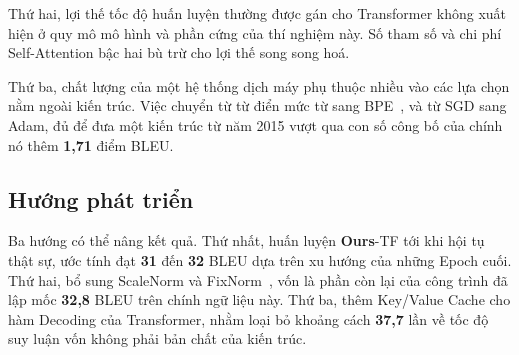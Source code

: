 \documentclass[11pt,a4paper]{article}
\newcommand{\ours}{\textbf{Ours}}
\begin{document}
Thứ hai, lợi thế tốc độ huấn luyện thường được gán cho Transformer không xuất
hiện ở quy mô mô hình và phần cứng của thí nghiệm này. Số tham số và chi phí
Self-Attention bậc hai bù trừ cho lợi thế song song hoá.

Thứ ba, chất lượng của một hệ thống dịch máy phụ thuộc nhiều vào các lựa chọn
nằm ngoài kiến trúc. Việc chuyển từ từ điển mức từ sang BPE~\cite{sennrich2016},
và từ SGD sang Adam, đủ để đưa một kiến trúc từ năm 2015 vượt qua con số công bố
của chính nó thêm \textbf{1,71} điểm BLEU.

\subsection{Hướng phát triển}

Ba hướng có thể nâng kết quả. Thứ nhất, huấn luyện \ours{}-TF tới khi hội tụ
thật sự, ước tính đạt \textbf{31} đến \textbf{32} BLEU dựa trên xu hướng của
những Epoch cuối. Thứ hai, bổ sung ScaleNorm và FixNorm~\cite{nguyen2019}, vốn
là phần còn lại của công trình đã lập mốc \textbf{32,8} BLEU trên chính ngữ liệu
này. Thứ ba, thêm Key/Value Cache cho hàm Decoding của Transformer, nhằm loại bỏ
khoảng cách \textbf{37,7} lần về tốc độ suy luận vốn không phải bản chất của
kiến trúc.
\end{document}
